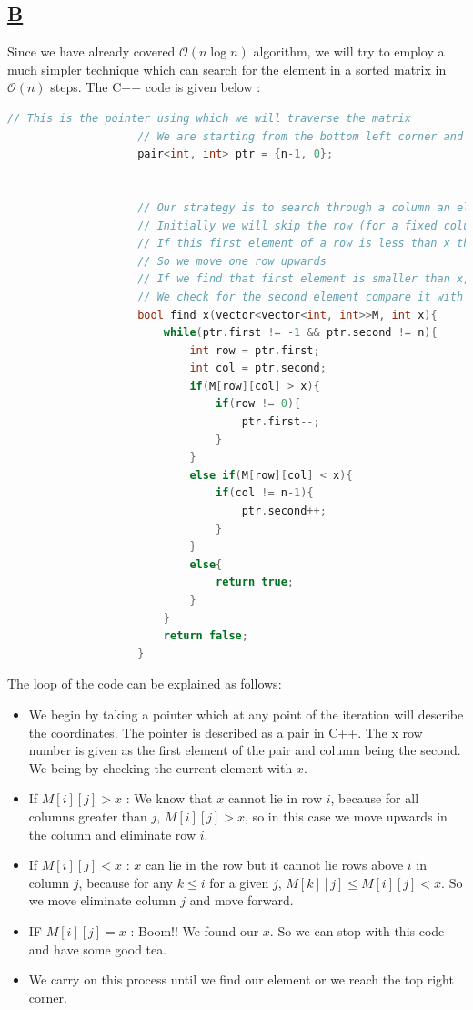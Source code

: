 \documentclass[14pt]{article}
\begin{document}
			\subsection*{\underline{B}}
				Since we have already covered $\mathcal{O}(n\log{n})$ algorithm, we will try to employ a much simpler technique which can search for the element in a sorted matrix in $\mathcal{O}(n)$ steps. The C++ code is given below :
				\begin{lstlisting}[language=C++]
					// This is the pointer using which we will traverse the matrix
					// We are starting from the bottom left corner and will traverse either in up or right direction
					pair<int, int> ptr = {n-1, 0};
					
					
					// Our strategy is to search through a column an element which is just less than the element we are searching for
					// Initially we will skip the row (for a fixed column) whose first element is greater than x
					// If this first element of a row is less than x then we know for sure our element does not lie in that row
					// So we move one row upwards
					// If we find that first element is smaller than x, then we stop and row then start parsing that row
					// We check for the second element compare it with x and repeat the same procedure
					bool find_x(vector<vector<int, int>>M, int x){
						while(ptr.first != -1 && ptr.second != n){
							int row = ptr.first;
							int col = ptr.second;
							if(M[row][col] > x){
								if(row != 0){
									ptr.first--;
								}
							}
							else if(M[row][col] < x){
								if(col != n-1){
									ptr.second++;
								}
							}
							else{
								return true;
							}
						}
						return false;
					}
				\end{lstlisting}
				The loop of the code can be explained as follows:
				\begin{itemize}
					\item We begin by taking a pointer which at any point of the iteration will describe the coordinates. The pointer is described as a pair in C++. The x row number is given as the first element of the pair and column being the second. We being by checking the current element with $x$.
					\item If $M[i][j] > x$ : We know that $x$ cannot lie in row $i$, because for all columns greater than $j$, $M[i][j] > x$, so in this case we move upwards in the column and eliminate row $i$.
					\item If $M[i][j] < x$ : $x$ can lie in the row but it cannot lie rows above $i$ in column $j$, because for any $k \leq i$ for a given $j$, $M[k][j] \leq M[i][j] < x$. So we move eliminate column $j$ and move forward. 
					\item IF $M[i][j] = x$ : Boom!! We found our $x$. So we can stop with this code and have some good tea.
					\item We carry on this process until we find our element or we reach the top right corner. 
				\end{itemize}
\end{document}
